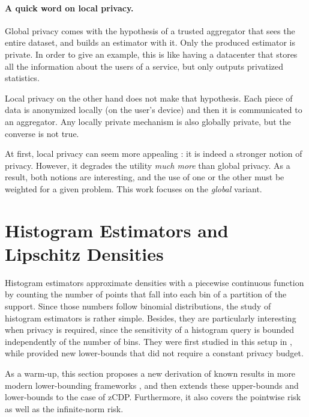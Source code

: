 \documentclass[10pt]{article} %
\begin{document}
\paragraph{A quick word on local privacy.}

Global privacy comes with the hypothesis of a trusted aggregator that sees the entire dataset, and builds an estimator with it. Only the produced estimator is private. In order to give an example, this is like having a datacenter that stores all the information about the users of a service, but only outputs privatized statistics.

Local privacy on the other hand does not make that hypothesis. Each piece of data is anonymized locally (on the user's device) and then it is communicated to an aggregator. Any locally private mechanism is also globally private, but the converse is not true.

At first, local privacy can seem more appealing : it is indeed a stronger notion of privacy. However, it degrades the utility \emph{much more} than global privacy. As a result, both notions are interesting, and the use of one or the other must be weighted for a given problem. This work focuses on the \emph{global} variant.

\section{Histogram Estimators and Lipschitz Densities}
\label{sec:histogram}


Histogram estimators approximate densities with a piecewise continuous function by counting the number of points that fall into each bin of a partition of the support. Since those numbers follow binomial distributions, the study of histogram estimators is rather simple. Besides, they are particularly interesting when privacy is required, since the sensitivity %
of a histogram query is bounded independently of the number of bins. They were first studied in this setup in \citet{wasserman2010statistical}, while \citet{barber2014privacy} provided new lower-bounds that did not require a constant privacy budget.

As a warm-up, this section proposes a new derivation of known results in more modern lower-bounding frameworks \citep{acharya2021differentially,kamath2022improved,lalanne2022statistical}, and then extends these upper-bounds and lower-bounds to the case of zCDP. Furthermore, it also covers the pointwise risk as well as the infinite-norm risk.
\end{document}
